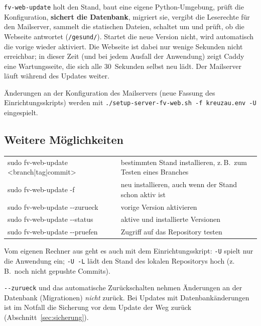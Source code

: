 \documentclass[a4paper,fontsize=10pt]{scrartcl}
\newcommand*{\cmd}[1]{\texttt{#1}}
\newcommand*{\pfad}[1]{\texttt{#1}}
\begin{document}
\cmd{fv-web-update} holt den Stand, baut eine eigene Python-Umgebung, prüft die
Konfiguration, \textbf{sichert die Datenbank}, migriert sie, vergibt die Leserechte
für den Mailserver, sammelt die statischen Dateien, schaltet um und prüft, ob die
Webseite antwortet (\pfad{/gesund/}). Startet die neue Version nicht, wird
automatisch die vorige wieder aktiviert. Die Webseite ist dabei nur wenige Sekunden
nicht erreichbar; in dieser Zeit (und bei jedem Ausfall der Anwendung) zeigt Caddy
eine Wartungsseite, die sich alle 30~Sekunden selbst neu lädt. Der Mailserver läuft
während des Updates weiter.

Änderungen an der Konfiguration des Mailservers (neue Fassung des
Einrichtungsskripts) werden mit \cmd{./setup-server-fv-web.sh -f kreuzau.env -U}
eingespielt.

\subsection{Weitere Möglichkeiten}

\begin{center}
\small
\begin{tabularx}{\textwidth}{@{}>{\ttfamily}lX@{}}
\toprule
sudo fv-web-update <branch|tag|commit> & bestimmten Stand installieren, z.\,B.\ zum Testen eines Branches \\
sudo fv-web-update -f                  & neu installieren, auch wenn der Stand schon aktiv ist \\
sudo fv-web-update -{}-zurueck          & vorige Version aktivieren \\
sudo fv-web-update -{}-status           & aktive und installierte Versionen \\
sudo fv-web-update -{}-pruefen          & Zugriff auf das Repository testen \\
\bottomrule
\end{tabularx}
\end{center}

Vom eigenen Rechner aus geht es auch mit dem Einrichtungsskript: \cmd{-U} spielt nur
die Anwendung ein; \cmd{-U -L} lädt den Stand des lokalen Repositorys hoch (z.\,B.\
noch nicht gepushte Commits).

\begin{dshinweis}[title={Zurück heißt nicht: Datenbank zurück}]
\cmd{-{}-zurueck} und das automatische Zurückschalten nehmen Änderungen an der
Datenbank (Migrationen) \emph{nicht} zurück. Bei Updates mit Datenbankänderungen
ist im Notfall die Sicherung vor dem Update der Weg zurück
(Abschnitt~\ref{sec:sicherung}).
\end{dshinweis}
\end{document}
